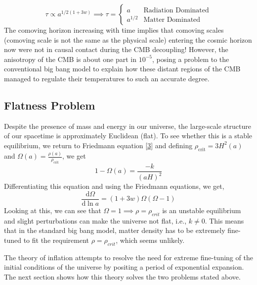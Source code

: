 \documentclass[aps,prd,reprint,preprintnumbers,showpacs,floatfix,nofootinbib,superscript address]{revtex4-2}
\begin{document}
\begin{equation}
    \tau \propto a^{1/2(1+3w)} \implies \tau = \begin{cases}
        a & \text{Radiation Dominated} \\
        a^{1/2} & \text{Matter Dominated}
    \end{cases}
\end{equation}
The comoving horizon increasing with time implies that comoving scales (comoving scale is not the same as the physical scale) entering the cosmic horizon now were not in causal contact during the CMB decoupling! However, the anisotropy of the CMB is about one part in $10^{-5}$, posing a problem to the conventional big bang model to explain how these distant regions of the CMB managed to regulate their temperatures to such an accurate degree.

\subsection{Flatness Problem}
Despite the presence of mass and energy in our universe, the large-scale structure of our spacetime is approximately Euclidean (flat). To see whether this is a stable equilibrium, we return to Friedmann equation \ref{3} and defining $\rho_{\text{crit}} = 3H^2(a)$ and $\Omega(a) = \frac{\rho(a)}{\rho_{\text{crit}}}$, we get
\begin{equation}
    1 - \Omega(a) = \frac{-k}{(aH)^2}
\end{equation}
Differentiating this equation and using the Friedmann equations, we get,
\begin{equation}
    \frac{\mathrm{d}\Omega}{\mathrm{d} \ln a} = (1+3w)\Omega(\Omega-1)
\end{equation}
Looking at this, we can see that $\Omega = 1  \implies \rho = \rho_{crit}$ is an unstable equilibrium and slight perturbations can make the universe not flat, i.e., $k \neq 0$. This means that in the standard big bang model, matter density has to be extremely fine-tuned to fit the requirement $\rho = \rho_{crit}$, which seems unlikely.

The theory of inflation attempts to resolve the need for extreme fine-tuning of the initial conditions of the universe by positing a period of exponential expansion. The next section shows how this theory solves the two problems stated above.
\end{document}
